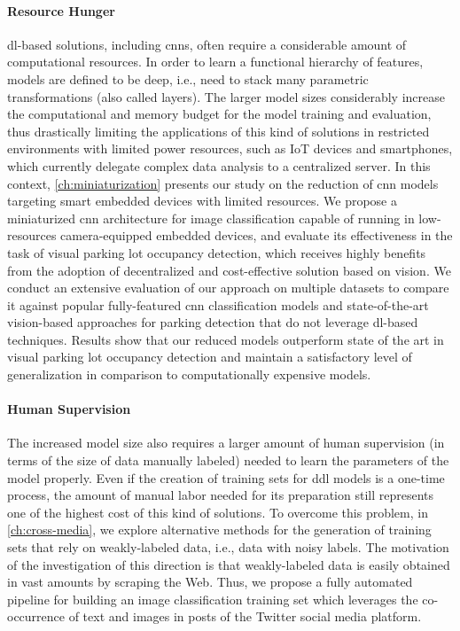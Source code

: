 \paragraph{Resource Hunger}
\Gls{dl}-based solutions, including \glspl{cnn}, often require a considerable amount of computational resources.
In order to learn a functional hierarchy of features, models are defined to be deep, i.e., need to stack many parametric transformations (also called layers).
The larger model sizes considerably increase the computational and memory budget for the model training and evaluation, thus
drastically limiting the applications of this kind of solutions in restricted environments with limited power resources, such as IoT devices and smartphones, which currently delegate complex data analysis to a centralized server.
In this context, \ref{ch:miniaturization} presents our study on the reduction of \gls{cnn} models targeting smart embedded devices with limited resources.
We propose a miniaturized \gls{cnn} architecture for image classification capable of running in low-resources camera-equipped embedded devices, and evaluate its effectiveness in the task of visual parking lot occupancy detection, which receives highly benefits from the adoption of decentralized and cost-effective solution based on vision.
We conduct an extensive evaluation of our approach on multiple datasets to compare it against popular fully-featured \gls{cnn} classification models and state-of-the-art vision-based approaches for parking detection that do not leverage \gls{dl}-based techniques.
Results show that our reduced models outperform state of the art in visual parking lot occupancy detection and maintain a satisfactory level of generalization in comparison to computationally expensive models.

\paragraph{Human Supervision}
The increased model size also requires a larger amount of human supervision (in terms of the size of data manually labeled) needed to learn the parameters of the model properly.
Even if the creation of training sets for d\gls{dl} models is a one-time process, the amount of manual labor needed for its preparation still represents one of the highest cost of this kind of solutions.
To overcome this problem, in \ref{ch:cross-media}, we explore alternative methods for the generation of training sets that rely on weakly-labeled data, i.e., data with noisy labels.
The motivation of the investigation of this direction is that weakly-labeled data is easily obtained in vast amounts by scraping the Web.
Thus, we propose a fully automated pipeline for building an image classification training set which leverages the co-occurrence of text and images in posts of the Twitter social media platform.

